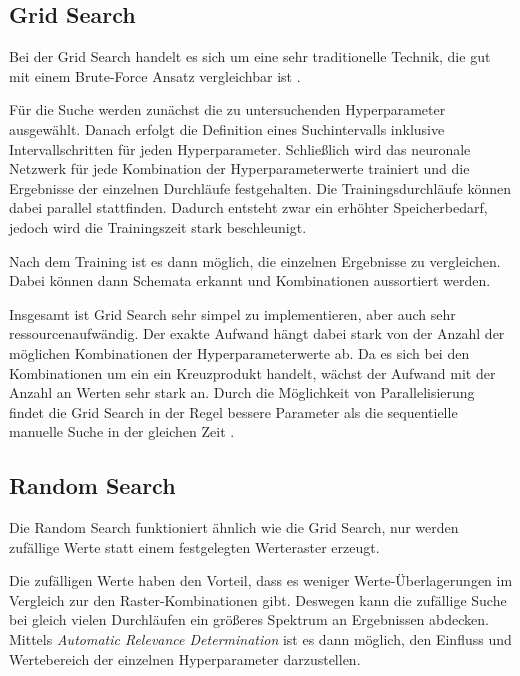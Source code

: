 \subsection{Grid Search}
Bei der Grid Search handelt es sich um eine sehr traditionelle Technik, die gut mit einem Brute-Force Ansatz vergleichbar ist \cite{hyperparameters-grid-search}.
\newline

Für die Suche werden zunächst die zu untersuchenden Hyperparameter ausgewählt.
Danach erfolgt die Definition eines Suchintervalls inklusive Intervallschritten für jeden Hyperparameter.
Schließlich wird das neuronale Netzwerk für jede Kombination der Hyperparameterwerte trainiert und die Ergebnisse der einzelnen Durchläufe festgehalten.
Die Trainingsdurchläufe können dabei parallel stattfinden.
Dadurch entsteht zwar ein erhöhter Speicherbedarf, jedoch wird die Trainingszeit stark beschleunigt.

Nach dem Training ist es dann möglich, die einzelnen Ergebnisse zu vergleichen.
Dabei können dann Schemata erkannt und Kombinationen aussortiert werden.
\newline

Insgesamt ist Grid Search sehr simpel zu implementieren, aber auch sehr ressourcenaufwändig.
Der exakte Aufwand hängt dabei stark von der Anzahl der möglichen Kombinationen der Hyperparameterwerte ab.
Da es sich bei den Kombinationen um ein ein Kreuzprodukt handelt, wächst der Aufwand mit der Anzahl an Werten sehr stark an.
Durch die Möglichkeit von Parallelisierung findet die Grid Search in der Regel bessere Parameter als die sequentielle manuelle Suche in der gleichen Zeit \cite{hyperparameters-random-search}.

\subsection{Random Search}
Die Random Search \cite{hyperparameters-random-search} funktioniert ähnlich wie die Grid Search, nur werden zufällige Werte statt einem festgelegten Werteraster erzeugt.
\newline

Die zufälligen Werte haben den Vorteil, dass es weniger Werte-Überlagerungen im Vergleich zur den Raster-Kombinationen gibt.
Deswegen kann die zufällige Suche bei gleich vielen Durchläufen ein größeres Spektrum an Ergebnissen abdecken.
Mittels \textit{Automatic Relevance Determination} \cite{automatic-relevance-determination} ist es dann möglich, den Einfluss und Wertebereich der einzelnen Hyperparameter darzustellen.
\newline

